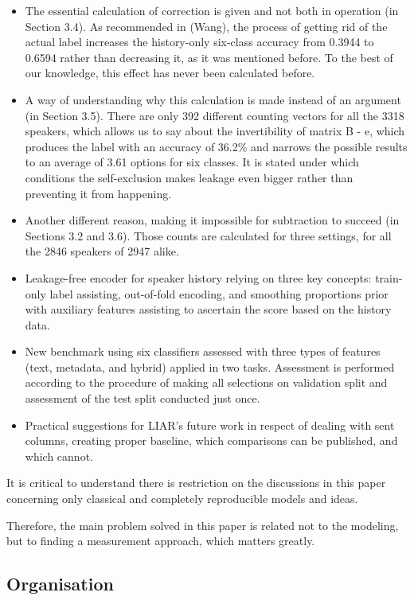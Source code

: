 \begin{itemize}
\item The essential calculation of correction is given and not both in operation (in Section 3.4). As recommended in (Wang), the process of getting rid of the actual label increases the history-only six-class accuracy from 0.3944 to 0.6594 rather than decreasing it, as it was mentioned before. To the best of our knowledge, this effect has never been calculated before.
\item A way of understanding why this calculation is made instead of an argument (in Section 3.5). There are only 392 different counting vectors for all the 3318 speakers, which allows us to say about the invertibility of matrix B - e, which produces the label with an accuracy of 36.2\% and narrows the possible results to an average of 3.61 options for six classes. It is stated under which conditions the self-exclusion makes leakage even bigger rather than preventing it from happening.
\item Another different reason, making it impossible for subtraction to succeed (in Sections 3.2 and 3.6). Those counts are calculated for three settings, for all the 2846 speakers of 2947 alike.
\item Leakage-free encoder for speaker history relying on three key concepts: train-only label assisting, out-of-fold encoding, and smoothing proportions prior with auxiliary features assisting to ascertain the score based on the history data.
\item New benchmark using six classifiers assessed with three types of features (text, metadata, and hybrid) applied in two tasks. Assessment is performed according to the procedure of making all selections on validation split and assessment of the test split conducted just once.
\item Practical suggestions for LIAR's future work in respect of dealing with sent columns, creating proper baseline, which comparisons can be published, and which cannot.
\end{itemize}

It is critical to understand there is restriction on the discussions in this paper concerning only classical and completely reproducible models and ideas.

Therefore, the main problem solved in this paper is related not to the modeling, but to finding a measurement approach, which matters greatly.

\subsection{Organisation}

